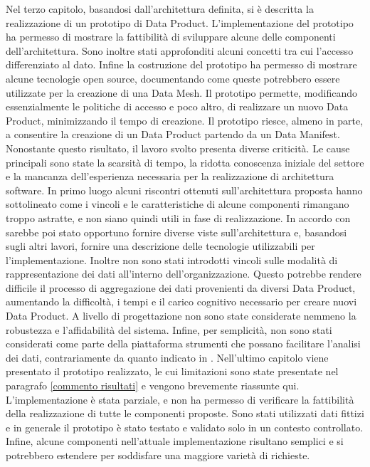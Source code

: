 \documentclass[a4paper,12pt]{report}
\begin{document}
Nel terzo capitolo, basandosi dall'architettura definita, si è descritta la realizzazione di un prototipo di Data Product.
L'implementazione del prototipo ha permesso di mostrare la fattibilità di sviluppare alcune delle componenti dell'architettura.
Sono inoltre stati approfonditi alcuni concetti tra cui l'accesso differenziato al dato.
Infine la costruzione del prototipo ha permesso di mostrare alcune tecnologie open source, documentando come queste potrebbero essere utilizzate per la creazione di una Data Mesh.
Il prototipo permette, modificando essenzialmente le politiche di accesso e poco altro, di realizzare un nuovo Data Product, minimizzando il tempo di creazione.
Il prototipo riesce, almeno in parte, a consentire la creazione di un Data Product partendo da un Data Manifest.
Nonostante questo risultato, il lavoro svolto presenta diverse criticità.
Le cause principali sono state la scarsità di tempo, la ridotta conoscenza iniziale del settore e la mancanza dell'esperienza necessaria per la realizzazione di architettura software.
In primo luogo alcuni riscontri ottenuti sull'architettura proposta hanno sottolineato come i vincoli e le caratteristiche di alcune componenti  rimangano troppo astratte, e non siano quindi utili in fase di realizzazione.
In accordo con \cite{perry_foundations_1992} sarebbe poi stato opportuno fornire diverse viste sull'architettura e, basandosi sugli altri lavori, fornire una descrizione delle tecnologie utilizzabili per l'implementazione.
Inoltre non sono stati introdotti vincoli sulle modalità di rappresentazione dei dati all'interno dell'organizzazione. 
Questo potrebbe rendere difficile il processo di aggregazione dei dati provenienti da diversi Data Product, aumentando la difficoltà, i tempi e il carico cognitivo necessario per creare nuovi Data Product.
A livello di progettazione non sono state considerate nemmeno la robustezza e l'affidabilità del sistema.
Infine, per semplicità, non sono stati considerati come parte della piattaforma strumenti che possano facilitare l'analisi dei dati, contrariamente da quanto indicato in \cite{dehghani_data_2022}.
Nell'ultimo capitolo viene presentato il prototipo realizzato,
le cui limitazioni sono state presentate nel paragrafo \ref{commento risultati} e vengono brevemente riassunte qui.
L'implementazione è stata parziale, e non ha permesso di verificare la fattibilità della realizzazione di tutte le componenti proposte.
Sono stati utilizzati dati fittizi e in generale il prototipo è stato testato e validato solo in un contesto controllato.
Infine, alcune componenti nell'attuale implementazione risultano semplici e si potrebbero estendere per soddisfare una maggiore varietà di richieste.
\end{document}
